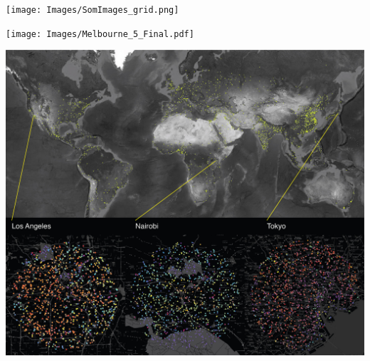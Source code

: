 \documentclass{nature}
\makeatletter
\renewenvironment*{figure}{\@float{figure}}{\end@float}
\makeatother
\begin{document}
\begin{figure}
\centering    
\texttt{[image: Images/SomImages\_grid.png]}  
\caption{\bf  A visualisation of the 2-dimensional 100x100 SOM trained with 1.7 million map images from 1667 cities.  Each x,y point shows a representative image associated with each node while nodes without associated images are shown in black.}    
 \label{fig:somresults}  
\end{figure} 

\begin{figure}
\centering    
\texttt{[image: Images/Melbourne\_5\_Final.pdf]}  
\caption{\bf  Map of Melbourne, Australia with 24027 individual map segments classified and colour coded. Insert image on bottom left shows colour coding scheme for SOM x,y locations of Figure \ref{fig:somresults}. Note, the central business district (CBD) region shows additional points due to inclusion of the 1000 circular sampling procedure in addition to the 23,027 locations sampled at 400m resolution. }    
 \label{fig:mel23000}  
\end{figure} 


\begin{figure}
\centering    
\includegraphics[scale=0.85]{Images/World-01.jpg}  
\caption{\bf  1667 world cities sampled with inserts showing detail of (left) San Francisco, (centre) Nairobi, and (right) Tokyo. City detail maps use the same SOM x,y location colour scheme as Figure \ref{fig:mel23000}.}    
 \label{fig:world}  
\end{figure} 
\end{document}
